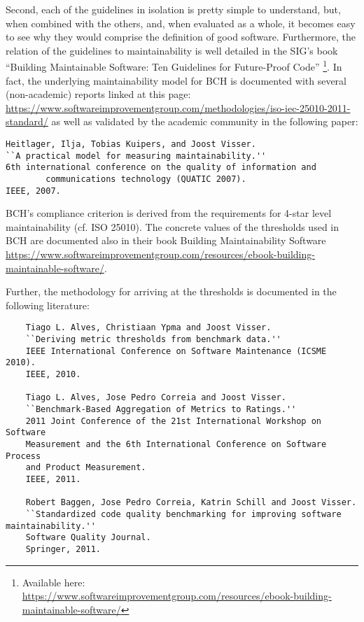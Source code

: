 \documentclass[11pt,fleqn]{article}
\begin{document}
Second, each of the guidelines in isolation is pretty simple to understand, but, when 
combined with the others, and, when evaluated as a whole, it becomes easy to see why 
they would comprise the definition of good software. Furthermore, the relation of the 
guidelines to maintainability is well detailed in the SIG's book ``Building Maintainable 
Software: Ten Guidelines for Future-Proof Code''
\footnote{Available here: \url{https://www.softwareimprovementgroup.com/resources/ebook-building-maintainable-software/}}.
In fact, the underlying maintainability model for BCH is documented with several
(non-academic) reports linked at this page:
\url{https://www.softwareimprovementgroup.com/methodologies/iso-iec-25010-2011-standard/} as 
well as validated by the academic community in the following paper:

\begin{verbatim}
Heitlager, Ilja, Tobias Kuipers, and Joost Visser. 
``A practical model for measuring maintainability.'' 
6th international conference on the quality of information and 
        communications technology (QUATIC 2007). 
IEEE, 2007.
\end{verbatim}

BCH's compliance criterion is derived from the requirements for 4-star level maintainability (cf. ISO 25010). 
The concrete values of the thresholds used in BCH are documented also in their book Building Maintainability 
Software \url{https://www.softwareimprovementgroup.com/resources/ebook-building-maintainable-software/}.

Further, the methodology for arriving at the thresholds is documented in the following 
literature:

\begin{verbatim}
    Tiago L. Alves, Christiaan Ypma and Joost Visser. 
    ``Deriving metric thresholds from benchmark data.'' 
    IEEE International Conference on Software Maintenance (ICSME 2010). 
    IEEE, 2010.

    Tiago L. Alves, Jose Pedro Correia and Joost Visser. 
    ``Benchmark-Based Aggregation of Metrics to Ratings.'' 
    2011 Joint Conference of the 21st International Workshop on Software 
    Measurement and the 6th International Conference on Software Process 
    and Product Measurement. 
    IEEE, 2011.

    Robert Baggen, Jose Pedro Correia, Katrin Schill and Joost Visser. 
    ``Standardized code quality benchmarking for improving software maintainability.'' 
    Software Quality Journal.
    Springer, 2011.

\end{verbatim}
\end{document}
